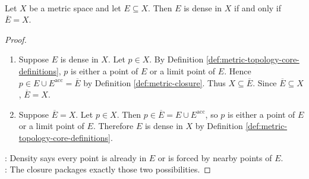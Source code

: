 \begin{proposition} \label{prop:dense-closure-criterion} \\
Let $X$ be a metric space and let $E\subseteq X$. Then $E$ is dense in $X$ if and only if $\overline{E}=X$.
\begin{proof}
\begin{enumerate}[label=\roman*.]
\setlength{\itemsep}{0pt}
\item[$(\Rightarrow)$] Suppose $E$ is dense in $X$. Let $p\in X$. By Definition \ref{def:metric-topology-core-definitions}, $p$ is either a point of $E$ or a limit point of $E$. Hence $p\in E\cup E^{\operatorname{acc}}=\overline{E}$ by Definition \ref{def:metric-closure}. Thus $X\subseteq\overline{E}$. Since $\overline{E}\subseteq X$, $\overline{E}=X$.
\item[$(\Leftarrow)$] Suppose $\overline{E}=X$. Let $p\in X$. Then $p\in\overline{E}=E\cup E^{\operatorname{acc}}$, so $p$ is either a point of $E$ or a limit point of $E$. Therefore $E$ is dense in $X$ by Definition \ref{def:metric-topology-core-definitions}.
\end{enumerate}
: Density says every point is already in $E$ or is forced by nearby points of $E$.\\
: The closure packages exactly those two possibilities.
\end{proof}
\end{proposition}

